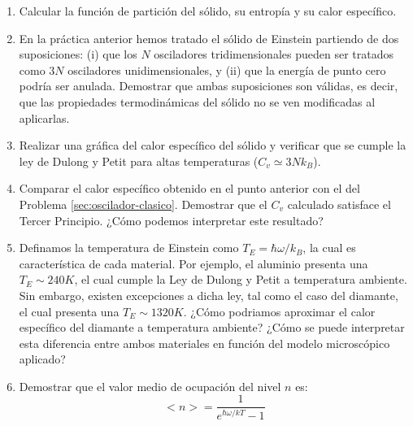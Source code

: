\documentclass[a4paper,11pt]{article}
\begin{document}
\begin{enumerate}[label=(\alph*),
                  leftmargin=2\parindent,
                  rightmargin=2\parindent]

    \item{Calcular la función de partición del sólido, su entropía y su calor 
          específico.}
    
    \item{En la práctica anterior hemos tratado el sólido de Einstein 
          partiendo de dos suposiciones:
          (i) que los $N$ osciladores tridimensionales pueden ser 
          tratados como $3N$ osciladores unidimensionales, y
          (ii) que la energía de punto cero podría ser anulada.
          Demostrar que ambas suposiciones son válidas, es decir, que 
          las propiedades termodinámicas del sólido no se ven 
          modificadas al aplicarlas.}
    
    \item{Realizar una gráfica del calor específico del sólido y 
          verificar que se cumple la ley de Dulong y Petit para altas 
          temperaturas ($C_v \simeq 3Nk_B$).}

    \item{Comparar el calor específico obtenido en el punto anterior 
          con el del Problema \ref{sec:oscilador-clasico}. Demostrar 
          que el $C_v$ calculado satisface el Tercer Principio. ¿Cómo 
          podemos interpretar este resultado?}
    
    \item{Definamos la temperatura de Einstein como
          $T_E = \hbar \omega / k_B $, la cual es característica de 
          cada material.
          Por ejemplo, el aluminio presenta una $T_E \sim 240 K$, el cual 
          cumple la Ley de Dulong y Petit a temperatura ambiente.
          Sin embargo, existen excepciones a dicha ley, tal como el 
          caso del diamante, el cual presenta una $T_E \sim 1320 K$.
          ¿Cómo podriamos aproximar el calor específico del diamante 
          a temperatura ambiente?
          ¿Cómo se puede interpretar esta diferencia entre ambos 
          materiales en función del modelo microscópico aplicado?
          }

    \item{Demostrar que el valor medio de ocupación del nivel $n$ es:
          $$<n> = \frac{1}{e^{\hbar \omega / kT} - 1}$$
          }

\end{enumerate}
\end{document}
